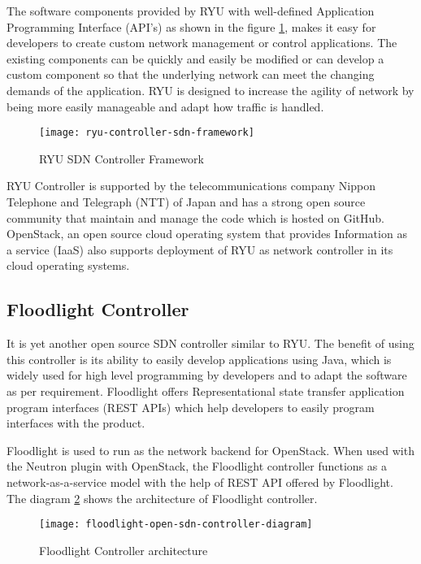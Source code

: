 The software components provided by RYU with well-defined Application Programming Interface (API’s) as shown in the figure \ref{fig:ryu-controller-sdn-framework}, makes it easy for developers to create custom network management or control applications. The existing components can be quickly and easily be modified or can develop a custom component so that the underlying network can meet the changing demands of the application. RYU is designed to increase the agility of network by being more easily manageable and adapt how traffic is handled.

\begin{figure}
	  \centering
	  \texttt{[image: ryu-controller-sdn-framework]}
	  \caption{RYU SDN Controller Framework \cite{ryu_framewrk_png}} \label{fig:ryu-controller-sdn-framework}
	  \vspace{-10pt}
\end{figure}

RYU Controller is supported by the telecommunications company Nippon Telephone and Telegraph (NTT) of Japan and has a strong open source community that maintain and manage the code which is hosted on GitHub. OpenStack, an open source cloud operating system that provides Information as a service (IaaS) \cite{OpenStack} also supports deployment of RYU as network controller in its cloud operating systems.
\subsection{Floodlight Controller \cite{Floodlight_defn}} \label{Floodlight_Controller}

It is yet another open source SDN controller similar to RYU. The benefit of using this controller is its ability to easily develop applications using Java, which is widely used for high level programming by developers and to adapt the software as per requirement. Floodlight offers Representational state transfer application program interfaces (REST APIs) which help developers to easily program interfaces with the product.

Floodlight is used to run as the network backend for OpenStack. When used with the Neutron plugin with OpenStack, the Floodlight controller functions as a network-as-a-service model with the help of REST API offered by Floodlight. The diagram \ref{fig:Floodlight_arch} shows the architecture of Floodlight controller.

\begin{figure}
	\centering
	\texttt{[image: floodlight-open-sdn-controller-diagram]}
	\caption{Floodlight Controller architecture \cite{Floodlight_arch}} \label{fig:Floodlight_arch}
	\vspace{-10pt}
\end{figure}

